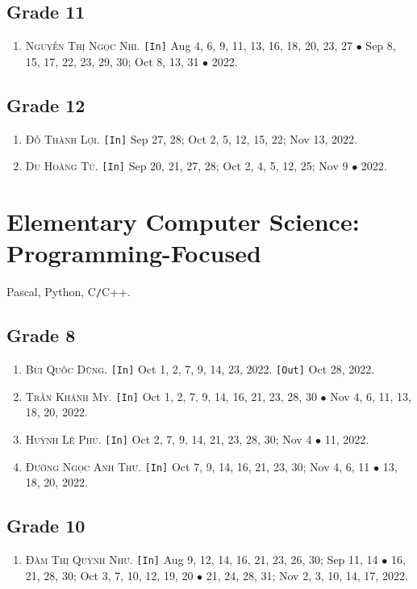 \documentclass{article}
\numberwithin{equation}{section}
\begin{document}
\subsection{Grade 11}
\begin{enumerate}
	\item \textsc{Nguyễn Thị Ngọc Nhi.} \texttt{[In]} Aug 4, 6, 9, 11, 13, 16, 18, 20, 23, 27 $\bullet$ Sep 8, 15, 17, 22, 23, 29, 30; Oct 8, 13, 31 $\bullet$ 2022.
\end{enumerate}

\subsection{Grade 12}
\begin{enumerate}
	\item \textsc{Đỗ Thành Lợi.} \texttt{[In]} Sep 27, 28; Oct 2, 5, 12, 15, 22; Nov 13, 2022.
	\item \textsc{Du Hoàng Tú.} \texttt{[In]} Sep 20, 21, 27, 28; Oct 2, 4, 5, 12, 25; Nov 9 $\bullet$ 2022.
\end{enumerate}


\section{Elementary Computer Science: Programming-Focused}
Pascal, Python, C\texttt{/}C++.

\subsection{Grade 8}
\begin{enumerate}
	\item \textsc{Bùi Quốc Dũng.} \texttt{[In]} Oct 1, 2, 7, 9, 14, 23, 2022. \texttt{[Out]} Oct 28, 2022.
	\item \textsc{Trần Khánh My.} \texttt{[In]} Oct 1, 2, 7, 9, 14, 16, 21, 23, 28, 30 $\bullet$ Nov 4, 6, 11, 13, 18, 20, 2022.
	\item \textsc{Huỳnh Lê Phú.} \texttt{[In]} Oct 2, 7, 9, 14, 21, 23, 28, 30; Nov 4 $\bullet$ 11, 2022.
	\item \textsc{Đường Ngọc Anh Thư.} \texttt{[In]} Oct 7, 9, 14, 16, 21, 23, 30; Nov 4, 6, 11 $\bullet$ 13, 18, 20, 2022.
\end{enumerate}

\subsection{Grade 10}
\begin{enumerate}
	\item \textsc{Đàm Thị Quỳnh Như.} \texttt{[In]} Aug 9, 12, 14, 16, 21, 23, 26, 30; Sep 11, 14 $\bullet$ 16, 21, 28, 30; Oct 3, 7, 10, 12, 19, 20 $\bullet$ 21, 24, 28, 31; Nov 2, 3, 10, 14, 17, 2022.
\end{enumerate}
\end{document}
